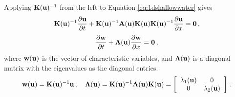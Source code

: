 Applying $\mathbf{K}(\mathbf{u})^{-1}$ from the left to Equation
\eqref{eq:1dshallowwater} gives
\begin{equation}
  \mathbf{K}(\mathbf{u})^{-1}\frac{\partial \mathbf{u}}{\partial t}
    + \mathbf{K}(\mathbf{u})^{-1}\mathbf{A}(\mathbf{u})
    \mathbf{K}(\mathbf{u})\mathbf{K}(\mathbf{u})^{-1}
    \frac{\partial \mathbf{u}}{\partial x}
  = \mathbf{0} \,,
\end{equation}
\begin{equation}
  \frac{\partial \mathbf{w}}{\partial t}
    + \mathbf{\Lambda}(\mathbf{u})\frac{\partial \mathbf{w}}{\partial x}
  = \mathbf{0} \,,
\end{equation}
where $\mathbf{w}(\mathbf{u})$ is the vector of
characteristic variables, and $\mathbf{\Lambda}(\mathbf{u})$ is a
diagonal matrix with the eigenvalues as the diagonal entries:
\begin{equation}
  \mathbf{w}(\mathbf{u}) =
    \mathbf{K}(\mathbf{u})^{-1}\mathbf{u} \,, \quad
  \mathbf{\Lambda}(\mathbf{u}) =
    \mathbf{K}(\mathbf{u})^{-1}\mathbf{A}(\mathbf{u})
    \mathbf{K}(\mathbf{u}) =
      \left[\begin{array}{c c}\lambda_1(\mathbf{u}) & 0\\
        0 & \lambda_2(\mathbf{u})\end{array}\right] \,.
\end{equation}



